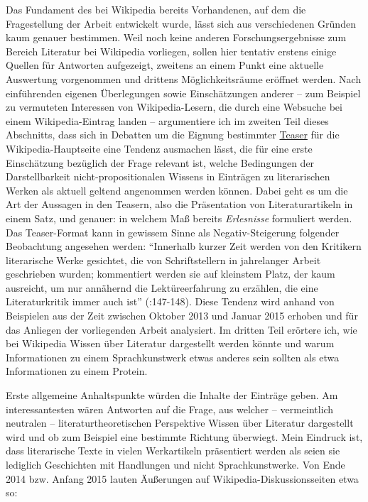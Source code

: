 \documentclass[fontsize=12pt]{scrartcl}
\begin{document}
Das Fundament des bei Wi\-ki\-pe\-dia bereits Vorhandenen, auf dem die Fragestellung der Arbeit ent\-wickelt wurde, l\"asst sich aus verschiedenen Gr\"unden kaum genauer bestimmen. Weil noch keine anderen For\-schungsergebnisse zum \mbox{Bereich} Li\-te\-ra\-tur bei Wi\-ki\-pe\-dia vorliegen, sollen \mbox{hier} tentativ erstens einige Quellen f\"ur Antworten aufgezeigt, zwei\-tens an einem Punkt eine aktuelle Auswertung vorgenommen und drittens M\"oglichkeitsr\"aume er\"offnet werden. Nach einf\"uhrenden eigenen \"Uberlegungen sowie Einsch\"atzungen an\-de\-rer -- zum Beispiel zu vermuteten Interessen von Wi\-ki\-pe\-dia-Lesern\textsuperscript{\tiny *}, die durch eine Websuche bei einem Wi\-ki\-pe\-dia-Eintrag landen -- argumentiere ich im zwei\-ten Teil dieses Ab\-schnitts, dass sich in Debatten um die Eignung bestimmter \href{https://de.wikipedia.org/wiki/Teaser}{Teaser} f\"ur die Wi\-ki\-pe\-dia-Hauptseite eine Tendenz ausmachen l\"asst, die f\"ur eine erste Einsch\"atzung bez\"uglich der Frage relevant ist, welche Bedingungen der Darstellbarkeit nicht-pro\-po\-si\-ti\-o\-na\-len Wissens in Eintr\"agen zu li\-te\-ra\-rischen Werken als aktuell geltend angenommen werden k\"onnen. Dabei geht es um die Art der Aussagen in den Teasern, also die Pr\"asentation von Li\-te\-ra\-tur\-artikeln in einem Satz, und genauer: in welchem Ma{\ss} bereits \textit{Erlesnisse} formuliert werden. Das Teaser-Format kann in gewissem Sinne als Negativ-Steigerung folgender Beobachtung angesehen werden: "`Innerhalb kurzer Zeit werden von den Kritikern li\-te\-ra\-rische Werke gesichtet, die von Schriftstellern in jahrelanger Arbeit geschrieben wurden; kommentiert werden sie auf kleinstem Platz, der kaum ausreicht, um nur ann\"ahernd die Lekt\"ureerfah\-rung zu erz\"ahlen, die eine Li\-te\-ra\-tur\-kritik immer auch ist"' (\cite{Schwens-Harrant2008}:147-148). Diese Tendenz wird anhand von Beispielen aus der Zeit zwischen Oktober 2013 und Januar 2015 erhoben und f\"ur das Anliegen der vorliegenden Arbeit ana\-lysiert. Im dritten Teil er\"ortere ich, wie bei Wi\-ki\-pe\-dia Wissen \"uber Li\-te\-ra\-tur dargestellt werden k\"onnte und warum Informationen zu einem Sprachkunstwerk etwas anderes sein sollten als etwa Informationen zu einem Protein.

Erste allgemeine Anhaltspunkte w\"urden die Inhalte der Eintr\"age geben. Am inte\-ressantesten w\"aren Antworten auf die Frage, aus welcher -- vermeintlich neutralen -- li\-te\-ra\-tur\-theo\-retischen Perspektive Wissen \"uber Li\-te\-ra\-tur dargestellt wird und ob zum Beispiel eine bestimmte Richtung \"uberwiegt. Mein Eindruck ist, dass li\-te\-ra\-rische Texte in vielen Werkartikeln pr\"asentiert werden als seien sie lediglich Geschichten mit Handlungen und nicht Sprachkunstwerke. Von Ende 2014 bzw. Anfang 2015 lauten \"Au{\ss}erungen auf Wi\-ki\-pe\-dia-Dis\-kus\-si\-onssei\-ten etwa so: 
\end{document}
